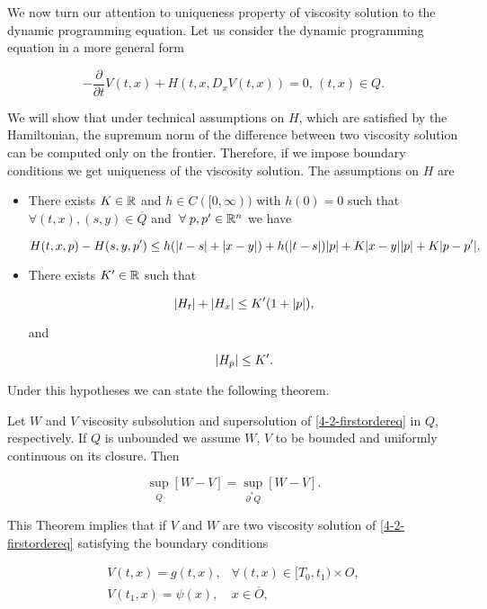 We now turn our attention to uniqueness property of viscosity solution to the dynamic programming equation. Let us consider the dynamic programming equation 
in a more general form

\begin{equation}\label{4-2-firstordereq}
    -\frac{\partial}{\partial t}V(t,x) + H(t,x,D_xV(t,x)) = 0,\,(t,x)\in Q.
\end{equation}

We will show that under technical assumptions on $H$, which are satisfied by the Hamiltonian, the supremum norm of the difference between two viscosity solution 
can be computed only on the frontier. Therefore, if we impose boundary conditions we get uniqueness of the viscosity solution. 
The assumptions on $H$ are

\begin{itemize}\label{4-2-Hassumptions}
    \item There exists $K\in\mathbb{R}$ and $h\in C([0,\infty))$ with $h(0)=0$ such that $\forall (t,x),(s,y)\in\overline{Q}$ and $\forall p,p'\in\R^n$ we have
    
    \[H(t,x,p)-H(s,y,p')\leq h(\abs{t-s}+\abs{x-y})+h(\abs{t-s})\abs{p}+K\abs{x-y}\abs{p} + K\abs{p-p'}.\]
    
    \item There exists $K'\in\mathbb{R}$ such that
    
    \[\abs{H_t}+\abs{H_x}\leq K'(1+\abs{p}),\]

    and

    \[\abs{H_p}\leq K'.\]
\end{itemize}

Under this hypotheses we can state the following theorem.

\begin{theorem}\label{4-2-Theo:Suponbound}
    Let $W$ and $V$ viscosity subsolution and supersolution of \ref{4-2-firstordereq} in $Q$, respectively. If $Q$ is unbounded we assume $W$, $V$ to be bounded and 
    uniformly continuous on its closure. Then
    
    \[\sup_{\overline{Q}}[W-V] = \sup_{\partial^{\ast}Q}[W-V].\]
\end{theorem}

This Theorem implies that if $V$ and $W$ are two viscosity solution of \ref{4-2-firstordereq} satisfying the boundary conditions

\begin{equation}
    \begin{aligned}
        V(t,x) = g(t,x),&\forall(t,x)\in[T_0,t_1)\times O, \\
        V(t_1,x) = \psi(x),&x\in\overline{O},
    \end{aligned}
\end{equation}

